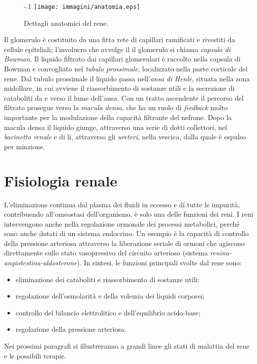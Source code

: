 \begin{figure}[p]
	\centering
	\advance\leftskip-.1\textwidth
		\texttt{[image: immagini/anatomia.eps]}
		\caption{Dettagli anatomici del rene.}\label{anatomia}
\end{figure}

Il glomerulo è costituito da una fitta rete di capillari ramificati e rivestiti da cellule epiteliali; l'involucro che avvolge il il glomerulo si chiama \textit{capsula di Bowman}. Il liquido filtrato dai capillari glomerulari è raccolto nella capsula di Bowman e convogliato nel \textit{tubulo prossimale}, localizzato nella parte corticale del rene. Dal tubulo prossimale il liquido passa nell'\textit{ansa di Henle}, situata nella zona midollare, in cui avviene il riassorbimento di sostanze utili e la secrezione di cataboliti da e verso il lume dell'ansa. Con un tratto ascendente il percorso del filtrato prosegue verso la \textit{macula densa}, che ha un ruolo di \textit{feedback} molto importante per la modulazione della capacità filtrante del nefrone. Dopo la macula densa il liquido giunge, attraverso una serie di dotti collettori, nel \textit{bacinetto renale} e di li, attraverso gli \textit{ureteri}, nella vescica, dalla quale è espulso per minzione.

\section{Fisiologia renale}
L'eliminazione continua dal plasma dei fluidi in eccesso e di tutte le impurità, contribuendo all'omeostasi dell'organismo, è solo una delle funzioni dei reni. I reni intervengono anche nella regolazione ormonale dei processi metabolici, perché sono anche dotati di un sistema endocrino. Un esempio è la capacità di controllo della pressione arteriosa attraverso la liberazione seriale di ormoni che agiscono direttamente sullo stato vasopressivo del circuito arterioso (sistema \textit{renina-angiotestina-aldosterone}). In sintesi, le funzioni principali svolte dal rene sono:
\begin{itemize}
	\item eliminazione dei cataboliti e riassorbimento di sostanze utili;
	\item regolazione dell'osmolarità e della volemia dei liquidi corporei;
	\item controllo del bilancio elettrolitico e dell'equilibrio acido-base;
	\item regolazione della pressione arteriosa.
\end{itemize}
Nei prossimi paragrafi si illustreranno a grandi linee gli stati di malattia del rene e le possibili terapie.

